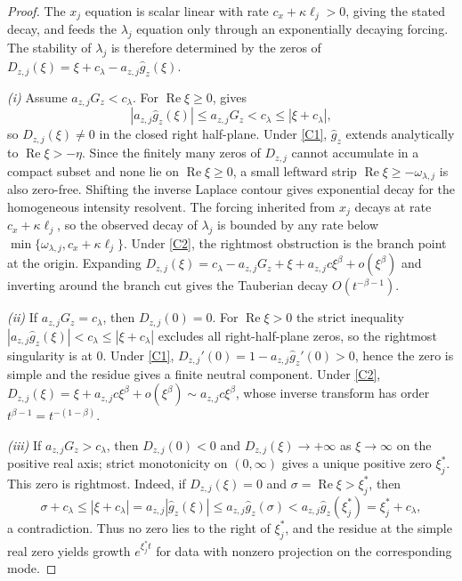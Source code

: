 \documentclass[11pt]{article}
\theoremstyle{plain}
\theoremstyle{definition}
\theoremstyle{remark}
\newcommand{\re}{\operatorname{Re}}
\newcommand{\abs}[1]{\left\lvert #1 \right\rvert}
\newcommand{\Laplace}{\widehat}
\begin{document}
\begin{proof}
The $x_j$ equation is scalar linear with rate $c_x+\kappa\ell_j>0$, giving the stated decay, and
feeds the $\lambda_j$ equation only through an exponentially decaying forcing. The stability of
$\lambda_j$ is therefore determined by the zeros of
$D_{z,j}(\xi)=\xi+c_\lambda-a_{z,j}\Laplace g_z(\xi)$.

\emph{(i)} Assume $a_{z,j}G_z<c_\lambda$. For $\re\xi\ge0$,  gives
\[
    \abs{a_{z,j}\Laplace g_z(\xi)}\le a_{z,j}G_z<c_\lambda\le\abs{\xi+c_\lambda},
\]
so $D_{z,j}(\xi)\ne0$ in the closed right half-plane. Under \ref{C1}, $\Laplace g_z$ extends
analytically to $\re\xi>-\eta$. Since the finitely many zeros of $D_{z,j}$ cannot accumulate in a
compact subset and none lie on $\re\xi\ge0$, a small leftward strip
$\re\xi\ge-\omega_{\lambda,j}$ is also zero-free. Shifting the inverse Laplace contour gives
exponential decay for the homogeneous intensity resolvent. The forcing inherited from $x_j$ decays
at rate $c_x+\kappa\ell_j$, so the observed decay of $\lambda_j$ is bounded by any rate below
$\min\{\omega_{\lambda,j},c_x+\kappa\ell_j\}$. Under \ref{C2}, the
rightmost obstruction is the branch point at the origin. Expanding
$D_{z,j}(\xi)=c_\lambda-a_{z,j}G_z+\xi+a_{z,j}c\xi^\beta+o(\xi^\beta)$ and inverting around the
branch cut gives the Tauberian decay $O(t^{-\beta-1})$.

\emph{(ii)} If $a_{z,j}G_z=c_\lambda$, then $D_{z,j}(0)=0$. For $\re\xi>0$ the strict inequality
$\abs{a_{z,j}\Laplace g_z(\xi)}<c_\lambda\le\abs{\xi+c_\lambda}$ excludes all right-half-plane
zeros, so the rightmost singularity is at $0$. Under \ref{C1},
$D_{z,j}'(0)=1-a_{z,j}\Laplace g_z'(0)>0$, hence the zero is simple and the residue gives a
finite neutral component. Under \ref{C2},
$D_{z,j}(\xi)=\xi+a_{z,j}c\xi^\beta+o(\xi^\beta)\sim a_{z,j}c\xi^\beta$, whose inverse transform
has order $t^{\beta-1}=t^{-(1-\beta)}$.

\emph{(iii)} If $a_{z,j}G_z>c_\lambda$, then $D_{z,j}(0)<0$ and $D_{z,j}(\xi)\to+\infty$ as
$\xi\to\infty$ on the positive real axis; strict monotonicity on $(0,\infty)$ gives a unique
positive zero $\xi_j^\ast$. This zero is rightmost. Indeed, if $D_{z,j}(\xi)=0$ and
$\sigma=\re\xi>\xi_j^\ast$, then
\[
    \sigma+c_\lambda\le\abs{\xi+c_\lambda}
       =a_{z,j}\abs{\Laplace g_z(\xi)}
       \le a_{z,j}\Laplace g_z(\sigma)
       <a_{z,j}\Laplace g_z(\xi_j^\ast)=\xi_j^\ast+c_\lambda,
\]
a contradiction. Thus no zero lies to the right of $\xi_j^\ast$, and the residue at the simple
real zero yields growth $e^{\xi_j^\ast t}$ for data with nonzero projection on the corresponding
mode.
\end{proof}
\end{document}
